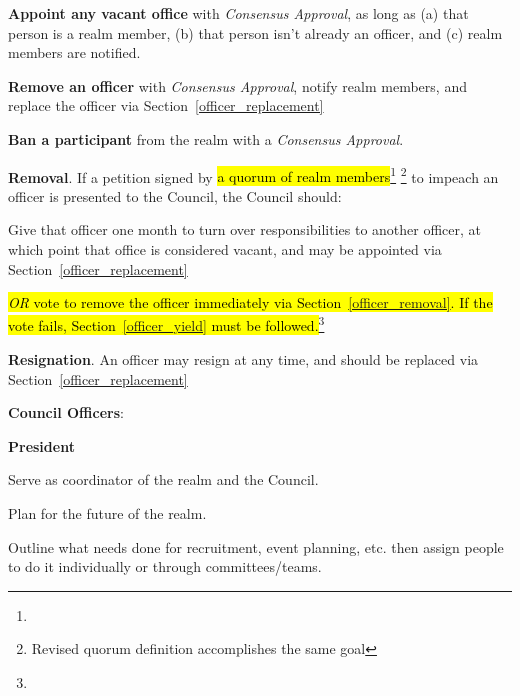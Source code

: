 \documentclass[12pt]{article}
\newcommand{\newpart}[2][]{\hl{#2}\expandafter\ifx\expandafter\relax\detokenize{#1}\relax\else\textnormal{\footnote{#1}}\fi}
\begin{document}
\begin{level}
\begin{level}
\begin{level}
            \item \textbf{Appoint any vacant office} with \emph{Consensus Approval}, as long as (a) that person is a realm member, (b) that person isn't already an officer, and (c) realm members are notified.\label{officer_replacement}
            \item \textbf{Remove an officer} with \emph{Consensus Approval}, notify realm members, and replace the officer via Section~\ref{officer_replacement}\label{officer_removal}
            \item \textbf{Ban a participant} from the realm with a \emph{Consensus Approval}.
        \end{level}
        \item \textbf{Removal}. If a petition signed by \newpart{a quorum of realm members} \footnote{Revised quorum definition accomplishes the same goal} to impeach an officer is presented to the Council, the Council should:
        \begin{level}
            \item Give that officer one month to turn over responsibilities to another officer, at which point that office is considered vacant, and may be appointed via Section~\ref{officer_replacement}\label{officer_yield}
            \item \newpart{\emph{OR} vote to remove the officer immediately via Section~\expandafter{\ref{officer_removal}}. If the vote fails, Section~\expandafter{\ref{officer_yield}} must be followed.}
        \end{level}
        \item \textbf{Resignation}. An officer may resign at any time, and should be replaced via Section~\ref{officer_replacement}
    \end{level}
    \item \textbf{Council Officers}:\label{council_officers}
    \begin{level}
    \item \textbf{President}
        \begin{level}
            \item Serve as coordinator of the realm and the Council.
            \item Plan for the future of the realm. 
            \item Outline what needs done for recruitment, event planning, etc. then assign people to do it individually or through committees/teams.

\end{level}
\end{level}
\end{level}
\end{document}
